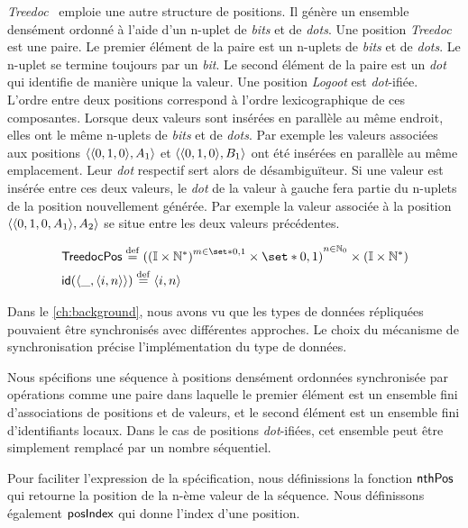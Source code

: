 \emph{Treedoc}~\autocite{preguica_2009_treedoc} emploie une autre structure de positions.
Il génère un ensemble densément ordonné à l'aide d'un n-uplet de \emph{bits} et de \emph{dots}.
Une position \emph{Treedoc} est une paire.
Le premier élément de la paire est un n-uplets de \emph{bits} et de \emph{dots}.
Le n-uplet se termine toujours par un \emph{bit}.
Le second élément de la paire est un \emph{dot} qui identifie de manière unique la valeur.
Une position \emph{Logoot} est \emph{dot}-ifiée.
L'ordre entre deux positions correspond à l'ordre lexicographique de ces composantes.
Lorsque deux valeurs sont insérées en parallèle au même endroit, elles ont le même n-uplets de \emph{bits} et de \emph{dots}.
Par exemple les valeurs associées aux positions $\tuple{\tuple*{0, 1, 0},A_1}$ et $\tuple{\tuple*{0, 1, 0},B_1}$ ont été insérées en parallèle au même emplacement.
Leur \emph{dot} respectif sert alors de désambiguïteur.
Si une valeur est insérée entre ces deux valeurs, le \emph{dot} de la valeur à gauche fera partie du n-uplets de la position nouvellement générée.
Par exemple la valeur associée à la position $\tuple{\tuple*{0, 1, 0, A_1},A_2}$ se situe entre les deux valeurs précédentes.

\begin{align}
&\trm{TreedocPos} \defeq {({(\mathbb{I} \times \mathbb{N}^*)}^{m \in \set*{0, 1}} \times \set*{0, 1})}^{n \in \mathbb{N}_0} \times (\mathbb{I} \times \mathbb{N}^*)\\
&\trm{id}(\tuple*{\_, \tuple*{i, n}}) \defeq \tuple*{i, n}
\end{align}

Dans le \autoref{ch:background}, nous avons vu que les types de données répliquées pouvaient être synchronisés avec différentes approches.
Le choix du mécanisme de synchronisation précise l'implémentation du type de données.

Nous spécifions une séquence à positions densément ordonnées synchronisée par opérations comme une paire dans laquelle le premier élément est un ensemble fini d'associations de positions et de valeurs, et le second élément est un ensemble fini d'identifiants locaux.
Dans le cas de positions \emph{dot}-ifiées, cet ensemble peut être simplement remplacé par un nombre séquentiel.

Pour faciliter l'expression de la spécification, nous définissions la fonction $\operatorname{\mathsf{nthPos}}$ qui retourne la position de la n-ème valeur de la séquence.
Nous définissons également $\operatorname{\mathsf{posIndex}}$ qui donne l'index d'une position.

